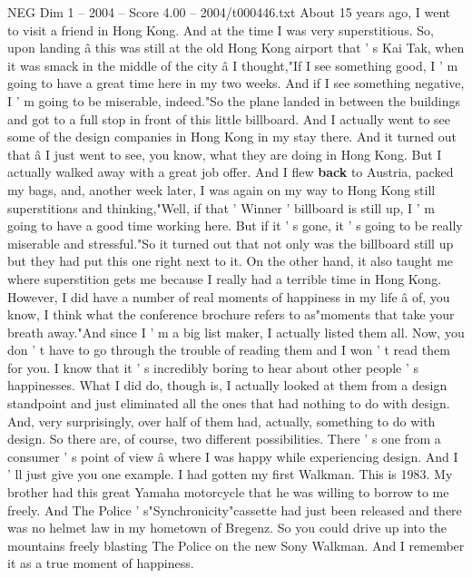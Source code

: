 \begin{textsample}{NEG Dim 1 – 2004 – Score 4.00 – 2004/t000446.txt}  \label{ex:f1_neg_058}
About 15 years ago, I went to visit a friend in Hong Kong.
And at the time I was very superstitious.
So, upon landing â this was still at the old Hong Kong airport that ' s Kai Tak, when it was smack in the middle of the city â I thought,"If I see something good, I ' m going to have a great time here in my two weeks.
And if I see something negative, I ' m going to be miserable, indeed."So the plane landed in between the buildings and got to a full stop in front of this little billboard.
And I actually went to see some of the design companies in Hong Kong in my stay there.
And it turned out that â I just went to see, you know, what they are doing in Hong Kong.
But I actually walked away with a great job offer.
And I flew \textbf{back} to Austria, packed my bags, and, another week later, I was again on my way to Hong Kong still superstitions and thinking,"Well, if that ' Winner ' billboard is still up, I ' m going to have a good time working here.
But if it ' s gone, it ' s going to be really miserable and stressful."So it turned out that not only was the billboard still up but they had put this one right next to it.
On the other hand, it also taught me where superstition gets me because I really had a terrible time in Hong Kong.
However, I did have a number of real moments of happiness in my life â of, you know, I think what the conference brochure refers to as"moments that take your breath away."And since I ' m a big list maker, I actually listed them all.
Now, you don ' t have to go through the trouble of reading them and I won ' t read them for you.
I know that it ' s incredibly boring to hear about other people ' s happinesses.
What I did do, though is, I actually looked at them from a design standpoint and just eliminated all the ones that had nothing to do with design.
And, very surprisingly, over half of them had, actually, something to do with design.
So there are, of course, two different possibilities.
There ' s one from a consumer ' s point of view â where I was happy while experiencing design.
And I ' ll just give you one example.
I had gotten my first Walkman.
This is 1983.
My brother had this great Yamaha motorcycle that he was willing to borrow to me freely.
And The Police ' s"Synchronicity"cassette had just been released and there was no helmet law in my hometown of Bregenz.
So you could drive up into the mountains freely blasting The Police on the new Sony Walkman.
And I remember it as a true moment of happiness.

\end{textsample}

